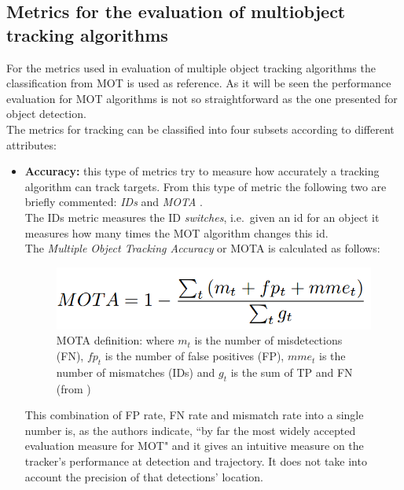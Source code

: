 \subsection{Metrics for the evaluation of multiobject tracking algorithms}
For the metrics used in evaluation of multiple object tracking algorithms the classification from MOT \cite{milan2016mot16} is used as reference. As it will be seen the performance evaluation for MOT algorithms is not so straightforward as the one presented for object detection.\\
The metrics for tracking can be classified into four subsets according to different attributes:
\begin{itemize}
    \item \textbf{Accuracy:} this type of metrics try to measure how accurately a tracking algorithm can track targets. From this type of metric the following two are briefly commented: \textit{IDs} \cite{yamaguchi2011you} and \textit{MOTA} \cite{bernardin2008evaluating}.\\ The IDs metric measures the ID \textit{switches}, i.e.\ given an id for an object it measures how many times the MOT algorithm changes this id.\\ The \textit{Multiple Object Tracking Accuracy} or MOTA is calculated as follows:
    \begin{figure}[H]
    \begin{center}
    \includegraphics[scale=0.3]{figures/mota.png}
    \caption{MOTA definition: where $m_t$ is the number of misdetections (FN), $fp_t$ is the number of false positives (FP), $mme_t$ is the number of mismatches (IDs) and $g_t$ is the sum of TP and FN (from \cite{bernardin2008evaluating})}
    \label{fig:mota}
    \end{center}
    \end{figure}
    This combination of FP rate, FN rate and mismatch rate into a single number is, as the authors indicate, ``by far the most widely accepted evaluation measure for MOT" \cite{milan2016mot16} and it gives an intuitive measure on the tracker's performance at detection and trajectory. It does not take into account the precision of that detections' location.


\end{itemize}

